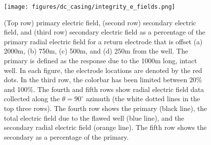 \begin{figure}
    \begin{center}
    \texttt{[image: figures/dc\_casing/integrity\_e\_fields.png]}
    \end{center}
\caption{
    (Top row) primary electric field, (second row) secondary electric field,
    and (third row) secondary electric field as a percentage of the primary radial electric field
    for a return electrode that is offset (a) 2000m, (b) 750m, (c) 500m, and (d) 250m
    from the well. The primary is defined as the response due to the 1000m
    long, intact well. In each figure, the electrode locations are denoted by
    the red dots. In the third row, the colorbar has been limited
    between 20\% and 100\%. The fourth and fifth rows show radial electric field data
    collected along the $\theta=90^\circ$ azimuth (the white dotted lines in
    the top three rows). The fourth row shows the primary (black line), the total
    electric field due to the flawed well (blue line), and the secondary
    radial electric field (orange line). The fifth row shows the secondary as a
    percentage of the primary.
}
\label{fig:integrity_e_fields}
\end{figure}
